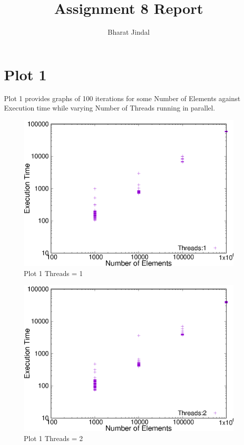 \documentclass{article}
\title{Assignment 8 Report}
\author{Bharat Jindal}
\begin{document}
\maketitle

\section{Plot 1}
Plot 1 provides graphs of 100 iterations for some Number of Elements against Execution time while varying Number of Threads running in parallel.
\begin{figure}[htb!]
\centering
\includegraphics[scale=0.9]{plot1_1.eps}
\caption{Plot 1 Threads = 1}
\end{figure}

\begin{figure}
\centering
\includegraphics[scale=0.9]{plot1_2.eps}
\caption{Plot 1 Threads = 2}
\end{figure}
\end{document}
